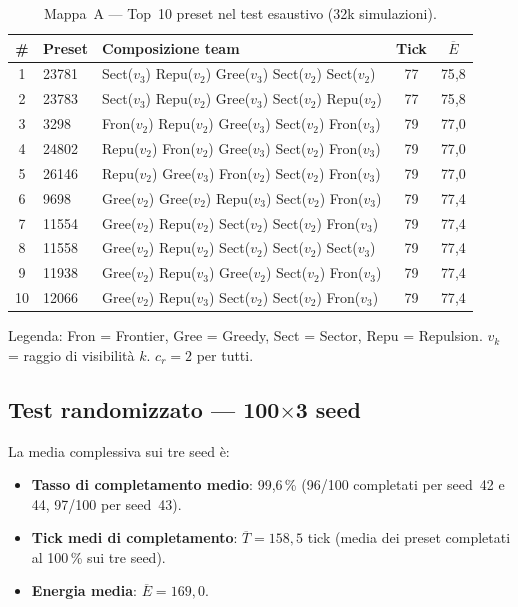 \begin{table}[H]
\centering
\caption{Mappa~A --- Top~10 preset nel test esaustivo (32k simulazioni).}
\label{tab:A32k-top10}
\small
\begin{tabular}{c l l c c}
\toprule
\textbf{\#} & \textbf{Preset} & \textbf{Composizione team} & \textbf{Tick} & $\overline{E}$ \\
\midrule
1  & 23781 & Sect($v_3$) Repu($v_2$) Gree($v_3$) Sect($v_2$) Sect($v_2$) & 77  & 75{,}8  \\
2  & 23783 & Sect($v_3$) Repu($v_2$) Gree($v_3$) Sect($v_2$) Repu($v_2$) & 77  & 75{,}8  \\
3  & 3298  & Fron($v_2$) Repu($v_2$) Gree($v_3$) Sect($v_2$) Fron($v_3$) & 79  & 77{,}0  \\
4  & 24802 & Repu($v_2$) Fron($v_2$) Gree($v_3$) Sect($v_2$) Fron($v_3$) & 79  & 77{,}0  \\
5  & 26146 & Repu($v_2$) Gree($v_3$) Fron($v_2$) Sect($v_2$) Fron($v_3$) & 79  & 77{,}0  \\
6  & 9698  & Gree($v_2$) Gree($v_2$) Repu($v_3$) Sect($v_2$) Fron($v_3$) & 79  & 77{,}4  \\
7  & 11554 & Gree($v_2$) Repu($v_2$) Sect($v_2$) Sect($v_2$) Fron($v_3$) & 79  & 77{,}4  \\
8  & 11558 & Gree($v_2$) Repu($v_2$) Sect($v_2$) Sect($v_2$) Sect($v_3$) & 79  & 77{,}4  \\
9  & 11938 & Gree($v_2$) Repu($v_3$) Gree($v_2$) Sect($v_2$) Fron($v_3$) & 79  & 77{,}4  \\
10 & 12066 & Gree($v_2$) Repu($v_3$) Sect($v_2$) Sect($v_2$) Fron($v_3$) & 79  & 77{,}4  \\
\bottomrule
\end{tabular}

\vspace{4pt}
{\footnotesize Legenda: Fron = Frontier, Gree = Greedy, Sect = Sector,
Repu = Repulsion. $v_k$ = raggio di visibilit\`a $k$. $c_r = 2$ per tutti.}
\end{table}

\subsection{Test randomizzato --- 100$\times$3 seed}

La media complessiva sui tre seed \`e:

\begin{itemize}
  \item \textbf{Tasso di completamento medio}: 99,6\,\% (96/100 completati per seed~42 e 44, 97/100 per seed~43).
  \item \textbf{Tick medi di completamento}: $\overline{T} = 158{,}5$ tick
        (media dei preset completati al 100\,\% sui tre seed).
  \item \textbf{Energia media}: $\overline{E} = 169{,}0$.
\end{itemize}

